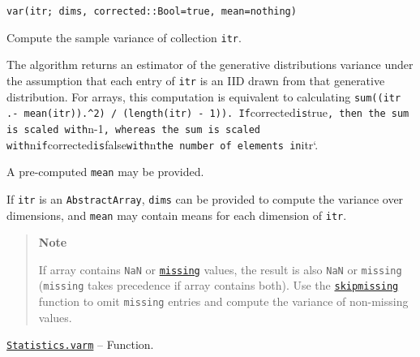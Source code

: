 \begin{adjustwidth}{2em}{0pt}


\begin{verbatim}
var(itr; dims, corrected::Bool=true, mean=nothing)
\end{verbatim}

Compute the sample variance of collection \texttt{itr}.

The algorithm returns an estimator of the generative distribution{\textquotesingle}s variance under the assumption that each entry of \texttt{itr} is an IID drawn from that generative distribution. For arrays, this computation is equivalent to calculating \texttt{sum((itr .- mean(itr)).{\textasciicircum}2) / (length(itr) - 1)). If}corrected\texttt{is}true\texttt{, then the sum is scaled with}n-1\texttt{, whereas the sum is scaled with}n\texttt{if}corrected\texttt{is}false\texttt{with}n\texttt{the number of elements in}itr`.

A pre-computed \texttt{mean} may be provided.

If \texttt{itr} is an \texttt{AbstractArray}, \texttt{dims} can be provided to compute the variance over dimensions, and \texttt{mean} may contain means for each dimension of \texttt{itr}.

\begin{quote}
\textbf{Note}

If array contains \texttt{NaN} or \hyperlink{14596725676261444434}{\texttt{missing}} values, the result is also \texttt{NaN} or \texttt{missing} (\texttt{missing} takes precedence if array contains both). Use the \hyperlink{2012470681884771400}{\texttt{skipmissing}} function to omit \texttt{missing} entries and compute the variance of non-missing values.

\end{quote}


\end{adjustwidth}
\hypertarget{11347311999392006255}{} 
\hyperlink{11347311999392006255}{\texttt{Statistics.varm}}  -- {Function.}

